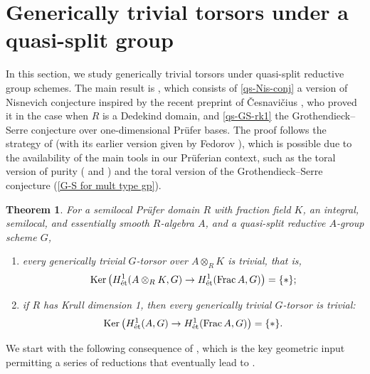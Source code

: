 \documentclass[JEP,XML,SOM,Unicode,published]{cedram}
\newenvironment{enumeratei}
{\bgroup\def\theenumi{\roman{enumi}}\def\theenumii{\arabic{enumii}}\begin{enumerate}}
{\end{enumerate}\egroup}
\newcommand{\et}{\textup{ét}}
\DeclareMathOperator{\Ker}{Ker}
\DeclareMathOperator{\Frac}{Frac}
\newcommand{\bthmt}{\begin{thm-tweak}}
\newcommand{\ethmt}{\end{thm-tweak}}
\newcommand{\benumr}{\begin{enumeratei}}
\newcommand{\eenumr}{\end{enumeratei}}
\theoremstyle{plain}
\newtheorem{thm-tweak}[subsection]{Theorem}
\theoremstyle{definition}
\begin{document}
\section{Generically trivial torsors under a quasi-split group}
In this section, we study generically trivial torsors under quasi-split reductive group schemes. The main result is , which consists of \eqref{qs-Nis-conj} a version of Nisnevich conjecture inspired by the recent preprint of \v{C}esnavi\v{c}ius \cite[Th.\,1.3(2)]{Ces22b}, who proved it in the case when $R$ is a Dedekind domain, and \eqref{qs-GS-rk1} the Grothendieck--Serre conjecture over one-dimensional Prüfer bases. The proof follows the strategy of \cite{Ces22a} (with its earlier version given by Fedorov \cite{Fed22b}), which is possible due to the availability of the main tools in our Prüferian context, such as the toral version of purity (\cf \cite[Th.\,3.3]{GL23} and ) and the toral version of the Grothendieck--Serre conjecture (\cf {}\eqref{G-S for mult type gp}).

\bthmt \label{qs-torsors}
For a semilocal Prüfer domain $R$ with fraction field $K$, an {integral}, semilocal, and essentially smooth $R$-algebra $A$, and a quasi-split reductive $A$-group scheme $G$,
\benumr
\item \label{qs-Nis-conj} every generically trivial $G$-torsor over $A\otimes_RK$ is trivial, that is,
\[
\Ker \left(H^1_{\et}(A\otimes_RK,G)\to H^1_{\et}(\Frac A,G)\right) =\{*\};
\]
\item \label{qs-GS-rk1} if $R$ has Krull dimension 1, then every generically trivial $G$-torsor is trivial:
\[
\Ker \left(H^1_{\et}(A,G)\to H^1_{\et}(\Frac A,G)\right) =\{*\}.
\]
\eenumr
\ethmt

We start with the following consequence of , which is the key geometric input permitting a series of reductions that eventually lead to .
\end{document}
